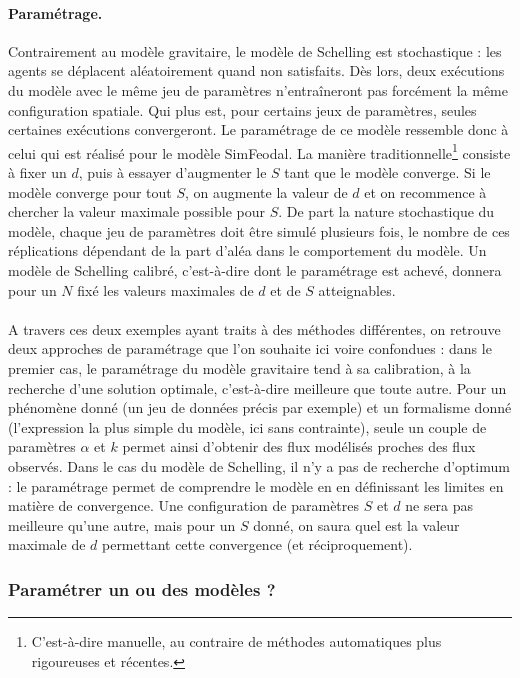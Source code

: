 \paragraph{Paramétrage.}
Contrairement au modèle gravitaire, le modèle de Schelling est stochastique :
 	les agents se déplacent aléatoirement quand non satisfaits.
Dès lors, deux exécutions du modèle avec le même jeu de paramètres n’entraîneront pas forcément la même configuration spatiale.
Qui plus est, pour certains jeux de paramètres, seules certaines exécutions convergeront.
Le paramétrage de ce modèle ressemble donc à celui qui est réalisé pour le modèle SimFeodal.
La manière \og traditionnelle\fg{}\footnote{
	C'est-à-dire manuelle, au contraire de méthodes automatiques plus rigoureuses et récentes.
} consiste à fixer un $d$, puis à essayer d'augmenter le $S$ tant que le modèle converge.
Si le modèle converge pour tout $S$, on augmente la valeur de $d$ et on recommence à chercher la valeur maximale possible pour $S$.
De part la nature stochastique du modèle, chaque jeu de paramètres doit être simulé plusieurs fois, le nombre de ces réplications dépendant de la part d'aléa dans le comportement du modèle.
Un modèle de Schelling calibré, c'est-à-dire dont le paramétrage est achevé,
donnera pour un $N$ fixé les valeurs maximales de $d$ et de $S$ atteignables.

\paragraph{}A travers ces deux exemples ayant traits à des méthodes différentes, on retrouve deux approches de paramétrage que l'on souhaite ici voire confondues :
	dans le premier cas, le paramétrage du modèle gravitaire tend à sa calibration, à la recherche d'une solution optimale, c'est-à-dire meilleure que toute autre.
Pour un phénomène donné (un jeu de données précis par exemple) et un formalisme donné (l'expression la plus simple du modèle, ici sans contrainte), seule un couple de paramètres $\alpha$ et $k$ permet ainsi d'obtenir des flux modélisés proches des flux observés.
Dans le cas du modèle de Schelling, il n'y a pas de recherche d'optimum :
	le paramétrage permet de comprendre le modèle en en définissant les limites en matière de convergence.
Une configuration de paramètres $S$ et $d$ ne sera pas meilleure qu'une autre, mais pour un $S$ donné, on saura quel est la valeur maximale de $d$ permettant cette convergence (et réciproquement).

\subsubsection{Paramétrer un ou des modèles ? \label{sssec:parametrer-un-des-modeles}}

